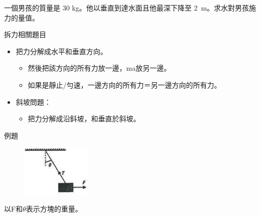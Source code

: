 \documentclass[beamer=true]{standalone}
\begin{document}
\begin{eg}
    一個男孩的質量是 30 kg。他以垂直到達水面且他最深下降至 \qty{2}{m}。求水對男孩施力的量值。
\end{eg}

\begin{frame}{拆力相關題目}
    \begin{itemize}
        \item 把力分解成水平和垂直方向。
              \begin{itemize}
                  \item 然後把該方向的所有力放一邊，ma放另一邊。
                  \item 如果是靜止/勻速，一邊方向的所有力＝另一邊方向的所有力。
              \end{itemize}
        \item 斜坡問題：
              \begin{itemize}
                  \item 把力分解成沿鈄坡，和垂直於斜坡。
              \end{itemize}
    \end{itemize}
\end{frame}

\begin{frame}[t]{例題}
    \begin{figure}[h!]
        \centering
        \includegraphics[width=0.3\textwidth]{assets/0b66fd6a.png}
    \end{figure}
    以F和$\theta$表示方塊的重量。
\end{frame}
\end{document}
